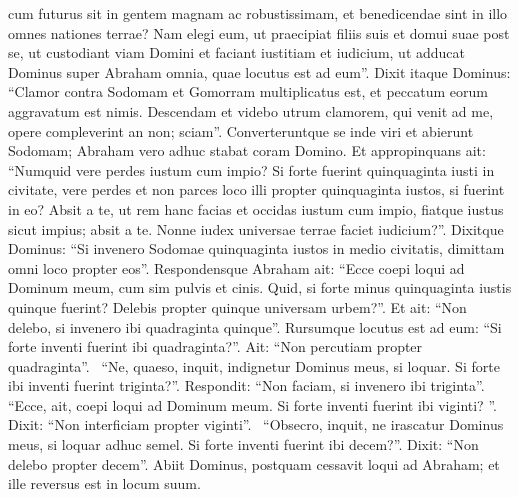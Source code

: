 \begin{biblechapter}
\begin{biblechapter}
\begin{biblechapter}
\begin{biblechapter}
\begin{biblechapter}
\begin{biblechapter}
\begin{biblechapter}
\begin{biblechapter}
\begin{biblechapter}
\begin{biblechapter}
\begin{biblechapter}
\begin{biblechapter}
\begin{biblechapter}
\begin{biblechapter}
\begin{biblechapter}
\begin{biblechapter}
\begin{biblechapter}
\begin{biblechapter}
\verse cum futurus sit in gentem magnam ac robustissimam, et benedicendae sint in illo omnes nationes terrae? 
\verse Nam elegi eum, ut praecipiat filiis suis et domui suae post se, ut custodiant viam Domini et faciant iustitiam et iudicium, ut adducat Dominus super Abraham omnia, quae locutus est ad eum”.
\verse Dixit itaque Dominus: “Clamor contra Sodomam et Gomorram multiplicatus est, et peccatum eorum aggravatum est nimis. 
\verse Descendam et videbo utrum clamorem, qui venit ad me, opere compleverint an non; sciam”.
 \verse Converteruntque se inde viri et abierunt Sodomam; Abraham vero adhuc stabat coram Domino.
\verse Et appropinquans ait: “Numquid vere perdes iustum cum impio? 
 \verse Si forte fuerint quinquaginta iusti in civitate, vere perdes et non parces loco illi propter quinquaginta iustos, si fuerint in eo? 
\verse Absit a te, ut rem hanc facias et occidas iustum cum impio, fiatque iustus sicut impius; absit a te. Nonne iudex universae terrae faciet iudicium?”. 
\verse Dixitque Dominus: “Si invenero Sodomae quinquaginta iustos in medio civitatis, dimittam omni loco propter eos”. 
\verse Respondensque Abraham ait: “Ecce coepi loqui ad Dominum meum, cum sim pulvis et cinis. 
\verse Quid, si forte minus quinquaginta iustis quinque fuerint? Delebis propter quinque universam urbem?”. Et ait: “Non delebo, si invenero ibi quadraginta quinque”. 
\verse Rursumque locutus est ad eum: “Si forte inventi fuerint ibi quadraginta?”. Ait: “Non percutiam propter quadraginta”. 
 \verse “Ne, quaeso, inquit, indignetur Dominus meus, si loquar. Si forte ibi inventi fuerint triginta?”. Respondit: “Non faciam, si invenero ibi triginta”. 
 \verse “Ecce, ait, coepi loqui ad Dominum meum. Si forte inventi fuerint ibi viginti? ”. Dixit: “Non interficiam propter viginti”. 
 \verse “Obsecro, inquit, ne irascatur Dominus meus, si loquar adhuc semel. Si forte inventi fuerint ibi decem?”. Dixit: “Non delebo propter decem”.
 \verse Abiit Dominus, postquam cessavit loqui ad Abraham; et ille reversus est in locum suum.
 

\end{biblechapter}
\end{biblechapter}
\end{biblechapter}
\end{biblechapter}
\end{biblechapter}
\end{biblechapter}
\end{biblechapter}
\end{biblechapter}
\end{biblechapter}
\end{biblechapter}
\end{biblechapter}
\end{biblechapter}
\end{biblechapter}
\end{biblechapter}
\end{biblechapter}
\end{biblechapter}
\end{biblechapter}
\end{biblechapter}
